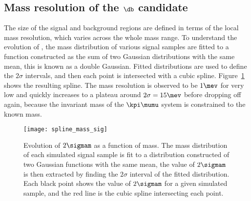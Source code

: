 
\subsection[Mass resolution of the \db candidate]
{Mass resolution of the $\boldsymbol{\db}$ candidate}
The size of the signal and background regions are defined in terms of the local mass resolution,
which varies across the whole mass range.
To understand the evolution of \sigmam, the mass distribution of various signal samples are fitted
to a function constructed as the sum of two Gaussian distributions with the same mean, this is
known as a double Gaussian.
Fitted distributions are used to define the $2\sigma$ intervals, and then each point is
intersected with a cubic spline.
Figure~\ref{fig:param:mass} shows the resulting spline.
The mass resolution is observed to be
\approx$1\mev$ for very low \mass{\db} and quickly increases to a plateau around $2\sigma=15\mev$
before dropping off again, because the invariant mass of the $\kpi\mumu$ system is constrained to
the known \Bd mass.

\begin{figure}
  \begin{center}
    \texttt{[image: spline\_mass\_sig]}
    \caption[Evolution of mass resolution with \mass{\db}]
    {
      Evolution of $2\sigmam$ as a function of mass.
      The mass distribution of each simulated signal sample is fit to a distribution constructed of
      two Gaussian functions with the same mean, the value of $2\sigmam$ is then extracted by
      finding the $2\sigma$ interval of the fitted distribution.
      Each black point shows the value of $2\sigmam$ for a given simulated \btokstrdb sample, and
      the red line is the cubic spline intersecting each point.
    }
    \label{fig:param:mass}
  \end{center}
\end{figure}


